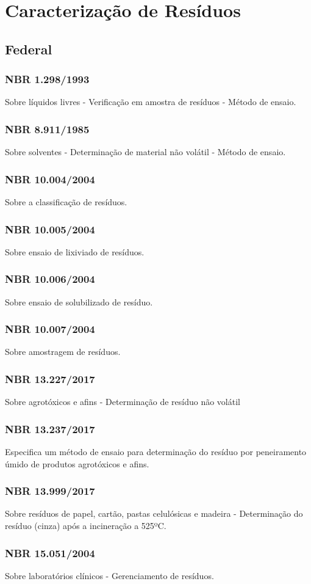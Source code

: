 \section{Caracterização de Resíduos}

\begin{subapend}
	\subsection{Federal}
	\begin{subsubapend}
		\item \subsubsection{NBR 1.298/1993}
		Sobre líquidos livres - Verificação em amostra de resíduos - Método de ensaio.
		\subsubsection{NBR 8.911/1985}
		Sobre solventes - Determinação de material não volátil - Método de ensaio.
		\subsubsection{NBR 10.004/2004}
		Sobre a classificação de resíduos.
		\subsubsection{NBR 10.005/2004}
		Sobre ensaio de lixiviado de resíduos.
		\subsubsection{NBR 10.006/2004}
		Sobre ensaio de solubilizado de resíduo.
		\subsubsection{NBR 10.007/2004}
		Sobre amostragem de resíduos.
		\subsubsection{NBR 13.227/2017}
		Sobre agrotóxicos e afins - Determinação de resíduo não volátil
		\subsubsection{NBR 13.237/2017}
		Especifica um método de ensaio para determinação do resíduo por peneiramento úmido de produtos agrotóxicos e afins.
		\subsubsection{NBR 13.999/2017}
		Sobre resíduos de papel, cartão, pastas celulósicas e madeira - Determinação do resíduo (cinza) após a incineração a 525ºC.
		\subsubsection{NBR 15.051/2004}
		Sobre laboratórios clínicos - Gerenciamento de resíduos.
	\end{subsubapend}
\end{subapend}

